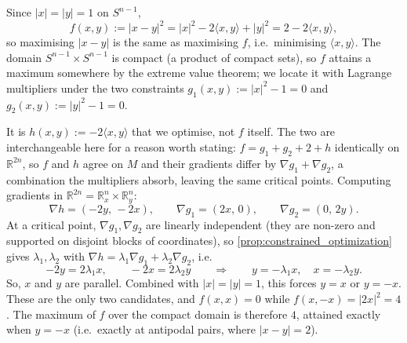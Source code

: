 \begin{exercisesolution}
\label{sol:antipodal_max_distance}
Since $|x|=|y|=1$ on $S^{n-1}$,
\[f(x,y) := |x-y|^2 = |x|^2 - 2\langle x,y\rangle + |y|^2 = 2 - 2\langle x,y\rangle,\]
so maximising $|x-y|$ is the same as maximising $f$, i.e.\ minimising $\langle x,y\rangle$.
The domain $S^{n-1}\times S^{n-1}$ is compact (a product of compact sets), so $f$ attains a
maximum somewhere by the extreme value theorem; we locate it with Lagrange multipliers under the
two constraints $g_1(x,y) := |x|^2-1 = 0$ and $g_2(x,y) := |y|^2-1=0$.

It is $h(x,y) := -2\langle x,y\rangle$ that we optimise, not $f$ itself. The two are interchangeable
here for a reason worth stating: $f = g_1 + g_2 + 2 + h$ identically on $\mathbb{R}^{2n}$, so $f$
and $h$ agree on $M$ and their gradients differ by $\nabla g_1 + \nabla g_2$, a combination the
multipliers absorb, leaving the same critical points. Computing gradients in
$\mathbb{R}^{2n} = \mathbb{R}^n_x \times \mathbb{R}^n_y$:
\[\nabla h = (-2y,\,-2x), \qquad \nabla g_1 = (2x,\,0), \qquad \nabla g_2 = (0,\,2y).\]
At a critical point, $\nabla g_1,\nabla g_2$ are linearly independent (they are non-zero and
supported on disjoint blocks of coordinates), so \cref{prop:constrained_optimization} gives
$\lambda_1,\lambda_2$ with $\nabla h = \lambda_1\nabla g_1 + \lambda_2\nabla g_2$, i.e.\
\[-2y = 2\lambda_1x, \qquad -2x = 2\lambda_2y \qquad\Longrightarrow\qquad
  y = -\lambda_1x, \quad x=-\lambda_2y.\]
So, $x$ and $y$ are parallel. Combined with $|x|=|y|=1$, this forces $y = x$ or $y=-x$.
These are the only two candidates, and $f(x,x) = 0$ while $f(x,-x) = |2x|^2 = 4$. The maximum
of $f$ over the compact domain is therefore $4$, attained exactly when $y=-x$ (i.e.\ exactly at
antipodal pairs, where $|x-y| = 2$).
\end{exercisesolution}

